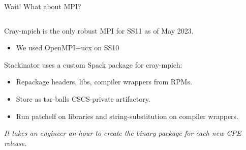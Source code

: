 \documentclass[aspectratio=43]{beamer}
\begin{document}
\begin{frame}[fragile]{Wait! What about MPI?}
    \begin{columns}[T]
        \begin{column}{0.65\textwidth}
            Cray-mpich is the only robust MPI for SS11 as of May 2023.
            \begin{itemize}
                \item We used OpenMPI+ucx on SS10
            \end{itemize}

            \vspace{10pt}

            Stackinator uses a custom Spack package for cray-mpich:
            \begin{itemize}
                \item Repackage headers, libs, compiler wrappers from RPMs.
                \item Store as tar-balls CSCS-private artifactory.
                \item Run patchelf on libraries and string-substitution on compiler wrappers.
            \end{itemize}
            \emph{It takes an engineer an hour to create the binary package for each new CPE release.}
        \end{column}
        \hspace{-40pt}
        \begin{column}{0.4\textwidth}
            {
            \setlength{\DTbaselineskip}{5pt}
            \footnotesize
            
            }
        \end{column}
    \end{columns}

\end{frame}
\end{document}
